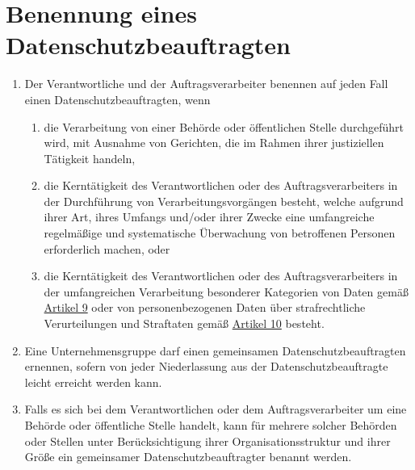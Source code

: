 \chapter{Benennung eines Datenschutzbeauftragten}
\label{ch:37}


\begin{enumerate}

  \item Der Verantwortliche und der Auftragsverarbeiter benennen auf jeden Fall einen Datenschutzbeauftragten, wenn
  \label{itm:37-1}

  \begin{enumerate}
  
    \item die Verarbeitung von einer Behörde oder öffentlichen Stelle durchgeführt wird, mit Ausnahme von Gerichten, die
     im Rahmen ihrer justiziellen Tätigkeit handeln,
    \label{itm:37-1a}

    \item die Kerntätigkeit des Verantwortlichen oder des Auftragsverarbeiters in der Durchführung von
     Verarbeitungsvorgängen besteht, welche aufgrund ihrer Art, ihres Umfangs und/oder ihrer Zwecke eine umfangreiche
     regelmäßige und systematische Überwachung von betroffenen Personen erforderlich machen, oder
    \label{itm:37-1b}

    \item die Kerntätigkeit des Verantwortlichen oder des Auftragsverarbeiters in der umfangreichen Verarbeitung
     besonderer Kategorien von Daten gemäß \hyperref[ch:9]{Artikel 9} oder von personenbezogenen Daten über
     strafrechtliche Verurteilungen und Straftaten gemäß \hyperref[ch:10]{Artikel 10} besteht.
    \label{itm:37-1c}

  \end{enumerate}

  \item Eine Unternehmensgruppe darf einen gemeinsamen Datenschutzbeauftragten ernennen, sofern von jeder Niederlassung
   aus der Datenschutzbeauftragte leicht erreicht werden kann.
  \label{itm:37-2}

  \item Falls es sich bei dem Verantwortlichen oder dem Auftragsverarbeiter um eine Behörde oder öffentliche Stelle
   handelt, kann für mehrere solcher Behörden oder Stellen unter Berücksichtigung ihrer Organisationsstruktur und ihrer
   Größe ein gemeinsamer Datenschutzbeauftragter benannt werden.
  \label{itm:37-3}


\end{enumerate}
